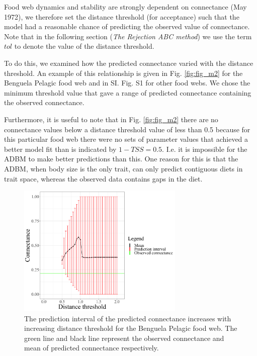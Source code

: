 \documentclass{article}
\begin{document}
Food web dynamics and stability are strongly dependent on connectance
(May 1972), we therefore set the distance threshold (for acceptance)
such that the model had a reasonable chance of predicting the observed
value of connectance. Note that in the following section (\emph{The
Rejection ABC method}) we use the term \(tol\) to denote the value of
the distance threshold.

To do this, we examined how the predicted connectance varied with the
distance threshold. An example of this relationship is given in Fig.
\ref{fig:fig_m2} for the Benguela Pelagic food web and in SI. Fig. S1
for other food webs. We chose the minimum threshold value that gave a
range of predicted connectance containing the observed connectance.

Furthermore, it is useful to note that in Fig. \ref{fig:fig_m2} there
are no connectance values below a distance threshold value of less than
0.5 because for this particular food web there were no sets of parameter
values that achieved a better model fit than is indicated by
\(1-TSS = 0.5\). I.e. it is impossible for the ADBM to make better
predictions than this. One reason for this is that the ADBM, when body
size is the only trait, can only predict contiguous diets in trait
space, whereas the observed data contains gaps in the diet.

\begin{figure}[h]

{\centering \includegraphics[width=300px]{fig/Benguela_Pelagic_connectanceCI_vs_tol} 

}

\caption{\label{fig:fig_m2}The prediction interval of the predicted connectance increases with increasing distance threshold for the Benguela Pelagic food web. The green line and black line represent the observed connectance and mean of predicted connectance respectively.}\label{fig:unnamed-chunk-4}
\end{figure}
\end{document}
